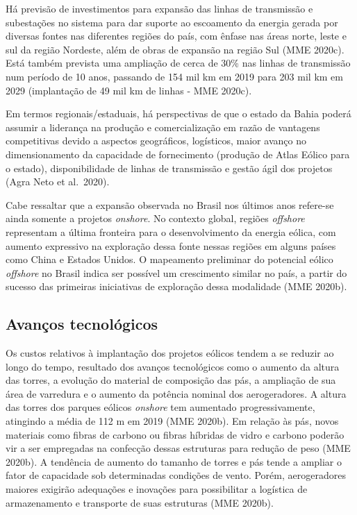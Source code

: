 \documentclass[
  oneside]{scrbook}
\begin{document}
Há previsão de investimentos para expansão das linhas de transmissão e subestações no sistema para dar suporte ao escoamento da energia gerada por diversas fontes nas diferentes regiões do país, com ênfase nas áreas norte, leste e sul da região Nordeste, além de obras de expansão na região Sul (MME 2020c). Está também prevista uma ampliação de cerca de 30\% nas linhas de transmissão num período de 10 anos, passando de 154 mil km em 2019 para 203 mil km em 2029 (implantação de 49 mil km de linhas - MME 2020c).

Em termos regionais/estaduais, há perspectivas de que o estado da Bahia poderá assumir a liderança na produção e comercialização em razão de vantagens competitivas devido a aspectos geográficos, logísticos, maior avanço no dimensionamento da capacidade de fornecimento (produção de Atlas Eólico para o estado), disponibilidade de linhas de transmissão e gestão ágil dos projetos (Agra Neto et al.~2020).

Cabe ressaltar que a expansão observada no Brasil nos últimos anos refere-se ainda somente a projetos \emph{onshore}. No contexto global, regiões \emph{offshore} representam a última fronteira para o desenvolvimento da energia eólica, com aumento expressivo na exploração dessa fonte nessas regiões em alguns países como China e Estados Unidos. O mapeamento preliminar do potencial eólico \emph{offshore} no Brasil indica ser possível um crescimento similar no país, a partir do sucesso das primeiras iniciativas de exploração dessa modalidade (MME 2020b).

\hypertarget{avanuxe7os-tecnoluxf3gicos}{%
\subsection{Avanços tecnológicos}\label{avanuxe7os-tecnoluxf3gicos}}

Os custos relativos à implantação dos projetos eólicos tendem a se reduzir ao longo do tempo, resultado dos avanços tecnológicos como o aumento da altura das torres, a evolução do material de composição das pás, a ampliação de sua área de varredura e o aumento da potência nominal dos aerogeradores. A altura das torres dos parques eólicos \emph{onshore} tem aumentado progressivamente, atingindo a média de 112 m em 2019 (MME 2020b). Em relação às pás, novos materiais como fibras de carbono ou fibras híbridas de vidro e carbono poderão vir a ser empregadas na confecção dessas estruturas para redução de peso (MME 2020b). A tendência de aumento do tamanho de torres e pás tende a ampliar o fator de capacidade sob determinadas condições de vento. Porém, aerogeradores maiores exigirão adequações e inovações para possibilitar a logística de armazenamento e transporte de suas estruturas (MME 2020b).
\end{document}
